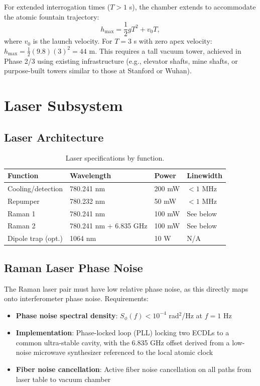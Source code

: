 \documentclass[12pt,a4paper]{article}
\begin{document}
For extended interrogation times ($T > 1$ s), the chamber extends
to accommodate the atomic fountain trajectory:
\begin{equation}
h_{\max} = \frac{1}{2}g T^2 + v_0 T,
\end{equation}
where $v_0$ is the launch velocity. For $T = 3$ s with zero apex
velocity: $h_{\max} = \frac{1}{2}(9.8)(3)^2 = 44$ m. This requires
a tall vacuum tower, achieved in Phase 2/3 using existing infrastructure
(e.g., elevator shafts, mine shafts, or purpose-built towers similar
to those at Stanford or Wuhan).


\section{Laser Subsystem}\label{sec:laser}

\subsection{Laser Architecture}

\begin{table}[H]
\centering
\begin{tabular}{llll}
\toprule
\textbf{Function} & \textbf{Wavelength} & \textbf{Power} & \textbf{Linewidth} \\
\midrule
Cooling/detection & 780.241 nm & 200 mW & $< 1$ MHz \\
Repumper & 780.232 nm & 50 mW & $< 1$ MHz \\
Raman 1 & 780.241 nm & 100 mW & See below \\
Raman 2 & 780.241 nm + 6.835 GHz & 100 mW & See below \\
Dipole trap (opt.) & 1064 nm & 10 W & N/A \\
\bottomrule
\end{tabular}
\caption{Laser specifications by function.}
\end{table}

\subsection{Raman Laser Phase Noise}

The Raman laser pair must have low relative phase noise, as this
directly maps onto interferometer phase noise. Requirements:

\begin{itemize}
\item \textbf{Phase noise spectral density}:
$S_\phi(f) < 10^{-4}$ rad$^2$/Hz at $f = 1$ Hz
\item \textbf{Implementation}: Phase-locked loop (PLL) locking two
ECDLs to a common ultra-stable cavity, with the 6.835 GHz offset
derived from a low-noise microwave synthesizer referenced to the local
atomic clock
\item \textbf{Fiber noise cancellation}: Active fiber noise cancellation
on all paths from laser table to vacuum chamber
\end{itemize}
\end{document}
